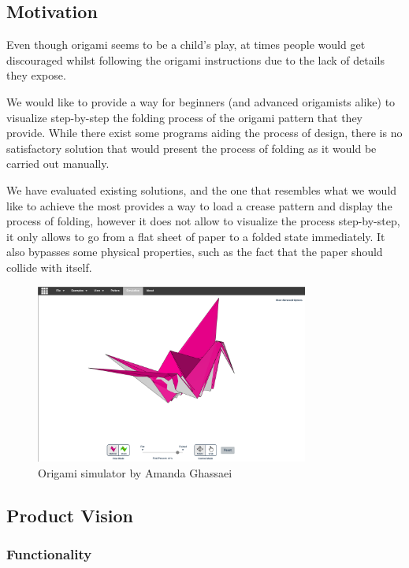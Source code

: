 \subsection{Motivation}

Even though origami seems to be a child's play, at times
people would get discouraged whilst following the origami instructions due to
the lack of details they expose.

We would like to provide a way for beginners (and advanced origamists alike) to visualize step-by-step the folding process of the origami pattern that they provide.
While there exist some programs aiding the process of design, there is no satisfactory solution
that would present the process of folding as it would be carried out manually.

We have evaluated existing solutions, and the one that resembles 
what we would like to achieve the most \cite{origami-simulator} provides a way to load a crease pattern
and display the process of folding, however it does not allow to visualize the process step-by-step, it only allows 
to go from a flat sheet of paper to a folded state immediately. It also bypasses some physical properties, such as the fact that the
paper should collide with itself.


\begin{figure}[H]
\caption{Origami simulator by Amanda Ghassaei}
  \centering
    \includegraphics[width=0.8\textwidth]{assets/origami-simulator.png}
\end{figure}

\subsection{Product Vision}

\subsubsection{Functionality}

